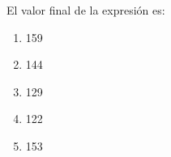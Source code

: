 {
El valor final de la expresión es:
\begin{enumerate}
	\item 159
	\item 144 %
	\item 129
	\item 122
	\item 153
\end{enumerate}
}
